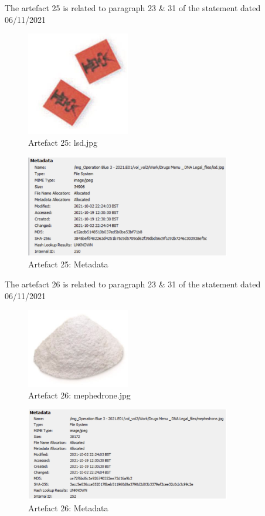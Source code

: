 The artefact 25 is related to paragraph 23 \& 31 of the statement
dated 06/11/2021
\begin{figure}[H]
  \centering
  \includegraphics[width=0.4\textwidth]{figures/artefact25}
  \caption{Artefact 25: lsd.jpg}
  \label{f:artefact25}
\end{figure}
\begin{figure}[H]
  \centering
  \includegraphics[width=0.8\textwidth]{figures/meta25}
  \caption{Artefact 25: Metadata}
  \label{f:meta25}
\end{figure}
The artefact 26 is related to paragraph 23 \& 31 of the statement
dated 06/11/2021
\begin{figure}[H]
  \centering
  \includegraphics[width=0.4\textwidth]{figures/artefact26}
  \caption{Artefact 26: mephedrone.jpg}
  \label{f:artefact26}
\end{figure}
\begin{figure}[H]
  \centering
  \includegraphics[width=0.8\textwidth]{figures/meta26}
  \caption{Artefact 26: Metadata}
  \label{f:meta26}
\end{figure}
